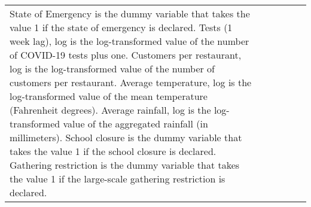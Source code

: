 \begin{table}[H]
\begin{tabular}{@{\extracolsep{1pt}}lccccc}
{{State of Emergency is the dummy variable that takes the value 1 if the state of emergency is declared. 
Tests (1 week lag), log is the log-transformed value of the number of COVID-19 tests plus one.
Customers per restaurant, log is the log-transformed value of the number of customers per restaurant.
Average temperature, log is the log-transformed value of the mean temperature (Fahrenheit degrees).
Average rainfall, log is the log-transformed value of the aggregated rainfall (in millimeters).
School closure is the dummy variable that takes the value 1 if the school closure is declared. 
Gathering restriction is the dummy variable that takes the value 1 if the large-scale gathering restriction is declared.}} \\
\end{tabular} 
\end{table} 
